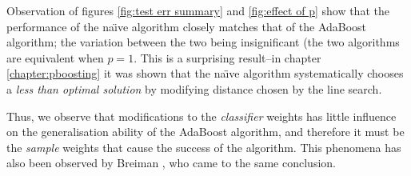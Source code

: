 Observation of figures \ref{fig:test err summary} and \ref{fig:effect
of p} show that the performance of the na\"{\i}ve algorithm closely
matches that of the AdaBoost algorithm; the variation between the two
being insignificant (the two algorithms are equivalent when $p = 1$.
This is a surprising result--in chapter \ref{chapter:pboosting} it was
shown that the na\"{\i}ve algorithm systematically chooses a
\emph{less than optimal solution} by modifying distance chosen by the
line search.

Thus, we observe that modifications to the \emph{classifier}
weights has little influence on the generalisation ability of the
AdaBoost algorithm, and therefore it must be the \emph{sample} weights
that cause the success of the algorithm.  This phenomena has also been
observed by Breiman \cite{Breiman96}, who came to the same conclusion.

